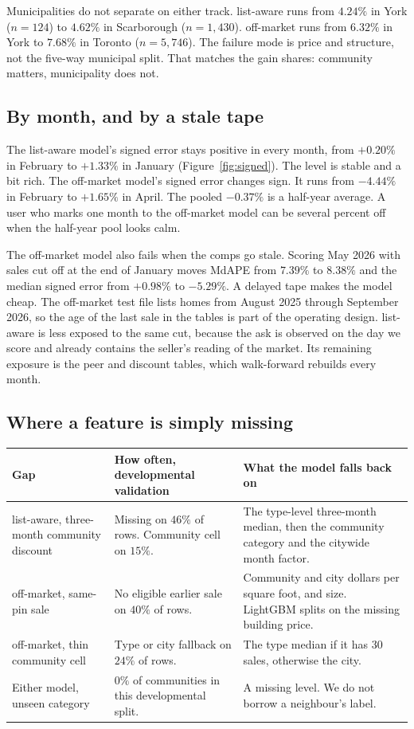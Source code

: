 \documentclass[11pt]{article}
\newcommand{\la}{list-aware}
\newcommand{\om}{off-market}
\begin{document}
Municipalities do not separate on either track. \la{} runs from \(4.24\%\) in York (\(n=124\)) to \(4.62\%\) in Scarborough (\(n=1{,}430\)). \om{} runs from \(6.32\%\) in York to \(7.68\%\) in Toronto (\(n=5{,}746\)). The failure mode is price and structure, not the five-way municipal split. That matches the gain shares: community matters, municipality does not.

\subsection{By month, and by a stale tape}

The list-aware model's signed error stays positive in every month, from \(+0.20\%\) in February to \(+1.33\%\) in January (Figure~\ref{fig:signed}). The level is stable and a bit rich. The off-market model's signed error changes sign. It runs from \(-4.44\%\) in February to \(+1.65\%\) in April. The pooled \(-0.37\%\) is a half-year average. A user who marks one month to the off-market model can be several percent off when the half-year pool looks calm.

The off-market model also fails when the comps go stale. Scoring May 2026 with sales cut off at the end of January moves MdAPE from \(7.39\%\) to \(8.38\%\) and the median signed error from \(+0.98\%\) to \(-5.29\%\). A delayed tape makes the model cheap. The off-market test file lists homes from August 2025 through September 2026, so the age of the last sale in the tables is part of the operating design. \la{} is less exposed to the same cut, because the ask is observed on the day we score and already contains the seller's reading of the market. Its remaining exposure is the peer and discount tables, which walk-forward rebuilds every month.

\subsection{Where a feature is simply missing}

\begin{center}
\small
\begin{tabular}{p{4.4cm}p{4.8cm}p{5.0cm}}
\toprule
Gap & How often, developmental validation & What the model falls back on \\
\midrule
\la, three-month community discount & Missing on \(46\%\) of rows. Community cell on \(15\%\). & The type-level three-month median, then the community category and the citywide month factor. \\
\om, same-pin sale & No eligible earlier sale on \(40\%\) of rows. & Community and city dollars per square foot, and size. LightGBM splits on the missing building price. \\
\om, thin community cell & Type or city fallback on \(24\%\) of rows. & The type median if it has 30 sales, otherwise the city. \\
Either model, unseen category & \(0\%\) of communities in this developmental split. & A missing level. We do not borrow a neighbour's label. \\
\bottomrule
\end{tabular}
\end{center}
\end{document}
